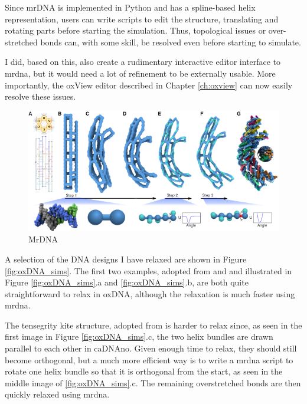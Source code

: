 Since mrDNA is implemented in Python and has a spline-based helix representation, users can write scripts to edit the structure, translating and rotating parts before starting the simulation. Thus, topological issues or over-stretched bonds can, with some skill, be resolved even before starting to simulate.

I did, based on this, also create a rudimentary interactive editor interface to mrdna, but it would need a lot of refinement to be externally usable. More importantly, the oxView editor described in Chapter \ref{ch:oxview} can now easily resolve these issues.

\begin{figure}[h]
  \begin{center}
    \includegraphics[width=\textwidth]{figures/mrDNA.jpg}
    \caption{MrDNA}
    \label{fig:mrdna}
  \end{center}
\end{figure}

A selection of the DNA designs I have relaxed are shown in Figure \ref{fig:oxDNA_sims}. The first two examples, adopted from \cite{gerling2015dynamic} and \cite{zadegan2012smallbox} and illustrated in Figure \ref{fig:oxDNA_sims}.a and \ref{fig:oxDNA_sims}.b, are both quite straightforward to relax in oxDNA, although the relaxation is much faster using mrdna.

The tensegrity kite structure, adopted from \cite{liedl2010_kite} is harder to relax since, as seen in the first image in Figure \ref{fig:oxDNA_sims}.c, the two helix bundles are drawn parallel to each other in caDNAno. Given enough time to relax, they should still become orthogonal, but a much more efficient way is to write a mrdna script to rotate one helix bundle so that it is orthogonal from the start, as seen in the middle image of \ref{fig:oxDNA_sims}.c. The remaining overstretched bonds are then quickly relaxed using mrdna.

